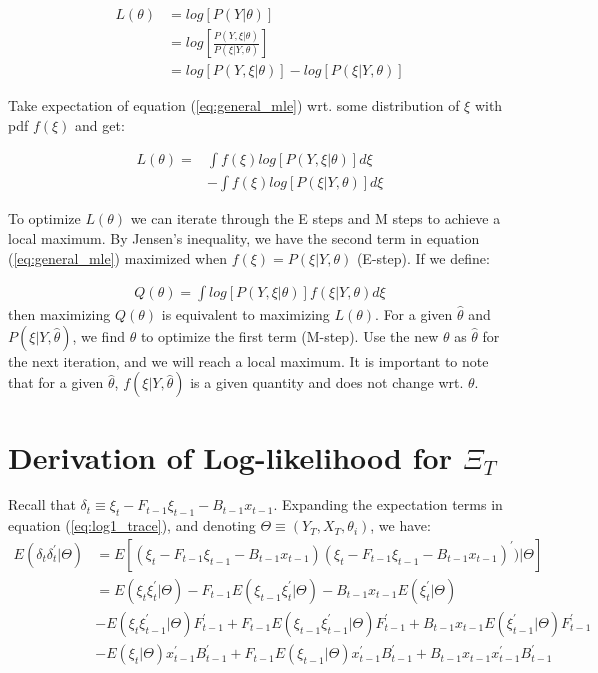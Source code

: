 \documentclass[12pt]{article}
\numberwithin{equation}{section}
\begin{document}
\begin{align}
    L(\theta) & = log[P(Y|\theta)] \nonumber \\
    & = log\left[\frac{P(Y,\xi|\theta)}{P(\xi|Y,\theta)}\right] \nonumber \\
    & = log[P(Y,\xi|\theta)] - log[P(\xi|Y,\theta)] \label{eq:general_mle}
\end{align}

Take expectation of equation (\ref{eq:general_mle}) wrt. some distribution of $\xi$ with pdf $f(\xi)$ and get:

\begin{align}
    L(\theta) = & \int f(\xi)log[P(Y,\xi|\theta)]d\xi \nonumber \\
    & - \int f(\xi)log[P(\xi|Y,\theta)]d\xi \nonumber
\end{align}

To optimize $L(\theta)$ we can iterate through the E steps and M steps to achieve a local maximum. By Jensen's inequality, we have the second term in equation (\ref{eq:general_mle}) maximized when $f(\xi)=P(\xi|Y,\theta)$ (E-step). If we define:

\begin{align}
    Q(\theta) = \int log[P(Y,\xi|\theta)]f(\xi|Y,\theta)d\xi \label{eq:Q}
\end{align}
then maximizing $Q(\theta)$ is equivalent to maximizing $ L(\theta)$. For a given $\hat{\theta}$ and $P(\xi|Y, \hat{\theta})$, we find $\theta$ to optimize the first term (M-step). Use the new $\theta$ as $\hat{\theta}$ for the next iteration, and we will reach a local maximum. It is important to note that for a given $\hat{\theta}$, $f(\xi|Y, \hat{\theta})$ is a given quantity and does not change wrt. $\theta$. 
\section{Derivation of Log-likelihood for $\Xi_T$} \label{ap:log}
Recall that $\delta_t \equiv \xi_t - F_{t-1}\xi_{t-1} - B_{t-1}x_{t-1}$. Expanding the expectation terms in equation (\ref{eq:log1_trace}), and denoting $\Theta \equiv (Y_T,X_T, \theta_i)$, we have:
\begin{align*}
    E(\delta_t\delta_t^{'}|\Theta) &= E[(\xi_t-F_{t-1}\xi_{t-1}-B_{t-1}x_{t-1}) 
    (\xi_t-F_{t-1}\xi_{t-1}-B_{t-1}x_{t-1})^{'})|\Theta] \\
    &= E(\xi_t\xi_t^{'}|\Theta) - F_{t-1}E(\xi_{t-1}\xi_{t}^{'}|\Theta) - B_{t-1}x_{t-1}E(\xi_t^{'}|\Theta) \\
    &- E(\xi_t\xi_{t-1}^{'}|\Theta)F_{t-1}^{'} + F_{t-1}E(\xi_{t-1}\xi_{t-1}^{'}|\Theta)F_{t-1}^{'}
    +B_{t-1}x_{t-1}E(\xi_{t-1}^{'}|\Theta)F_{t-1}^{'} \\
    &- E(\xi_t|\Theta)x_{t-1}^{'}B_{t-1}^{'} + F_{t-1}E(\xi_{t-1}|\Theta)x_{t-1}^{'}B_{t-1}^{'}
    +B_{t-1}x_{t-1}x_{t-1}^{'}B_{t-1}^{'}
\end{align*}
\end{document}
